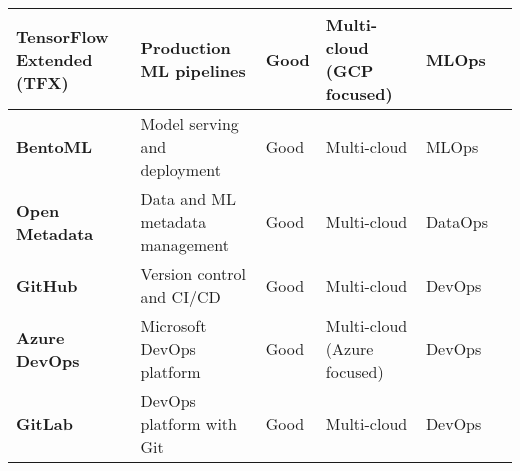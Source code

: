 \begin{longtable}{|p{2cm}|p{3.5cm}|p{2cm}|p{2cm}|p{1.5cm}|p{1.5cm}|}
    \textbf{TensorFlow Extended (TFX)} & Production ML pipelines & Good & Multi-cloud (GCP focused) & MLOps & \cite{Kreuzberger2022MachineLO} \\
    \hline

    \textbf{BentoML} & Model serving and deployment & Good & Multi-cloud & MLOps & \cite{9792270,BURGUENOROMERO2025107499,mlops-definition-tools-and-challenge} \\
    \hline

    \textbf{Open Metadata} & Data and ML metadata management & Good & Multi-cloud & DataOps & \cite{} \\
    \hline

    \textbf{GitHub} & Version control and CI/CD & Good & Multi-cloud & DevOps & \cite{} \\
    \hline

    \textbf{Azure DevOps} & Microsoft DevOps platform & Good & Multi-cloud (Azure focused) & DevOps & \cite{Kreuzberger2022MachineLO,gift2021practical} \\
    \hline

    \textbf{GitLab} & DevOps platform with Git & Good & Multi-cloud & DevOps & \cite{9792270} \\
    \hline

\end{longtable}
\normalsize